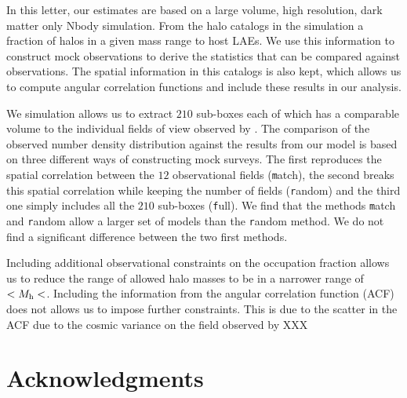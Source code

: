 \documentclass[usenatbib]{mn2e}
\begin{document}
In this letter, our estimates are based on a large volume, high
resolution, dark matter only Nbody simulation. From the halo catalogs
in the simulation a fraction of halos in a given mass range to
host LAEs. We use this information to construct mock observations to
derive the statistics that can be compared against observations. The
spatial information in this catalogs is also kept, which allows us to
compute angular correlation functions and include these results in our
analysis. 

We simulation allows us to extract $210$ sub-boxes each of which has a
comparable volume to the individual fields of view observed by
\cite{Yamada2012}. The comparison of the observed number density
distribution against the results from our model is based on three
different ways of constructing mock surveys. The first reproduces the
spatial correlation between the $12$ observational fields ({\texttt
  match}), the second breaks this spatial correlation while keeping
the number of fields ({\texttt random}) and the third one simply
includes all the $210$ sub-boxes ({\texttt full}). We find that the
methods {\texttt match} and {\texttt random} allow a larger set of
models than the {{\texttt random}} method. We do not find a
significant difference between the two first methods. 


Including additional observational constraints on the occupation
fraction allows us to reduce the range of allowed halo masses to be in
a narrower range of $<M_{\rm h}<$. Including the information from the
angular correlation function (ACF) does not allows us to impose
further constraints. This is due to the scatter in the ACF due to the
cosmic variance on the field observed by XXX




\section*{Acknowledgments} 
\end{document}
